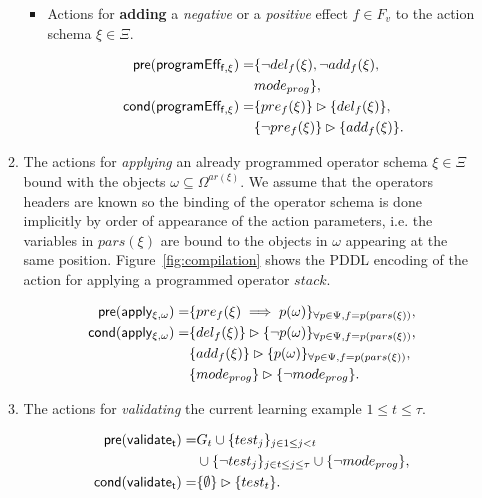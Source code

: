 \documentclass[letterpaper]{article} %
\newcommand{\pre}{\mathsf{pre}}     %
\newcommand{\cond}{\mathsf{cond}}   %
\begin{document}
\begin{itemize}
\begin{enumerate}
\begin{itemize}
\item Actions for {\bf adding} a {\em negative} or a {\em positive} effect $f\in F_v$ to the action schema $\xi\in\Xi$.

\begin{small}
\begin{align*}
\hspace*{7pt}\pre(\mathsf{programEff_{f,\xi}})=&\{\neg del_{f}(\xi),\neg add_{f}(\xi),\\
& mode_{prog}\},\\
\cond(\mathsf{programEff_{f,\xi}})=&\{pre_{f}(\xi)\}\rhd\{del_{f}(\xi)\},\\
&\{\neg pre_{f}(\xi)\}\rhd\{add_{f}(\xi)\}.
\end{align*}
\end{small}
\end{itemize}

\item The actions for {\em applying} an already programmed operator schema $\xi\in\Xi$ bound with the objects $\omega\subseteq\Omega^{ar(\xi)}$. We assume that the operators headers are known so the binding of the operator schema is done implicitly by order of appearance of the action parameters, i.e. the variables in $pars(\xi)$ are bound to the objects in $\omega$ appearing at the same position. Figure~\ref{fig:compilation} shows the PDDL encoding of the action for applying a programmed operator $stack$.
\begin{small}
\begin{align*}
\hspace*{7pt}\pre(\mathsf{apply_{\xi,\omega}})=&\{pre_{f}(\xi)\implies p(\omega)\}_{\forall p\in\Psi,f=p(pars(\xi))},\\
\cond(\mathsf{apply_{\xi,\omega}})=&\{del_{f}(\xi)\}\rhd\{\neg p(\omega)\}_{\forall p\in\Psi,f=p(pars(\xi))},\\
&\{add_{f}(\xi)\}\rhd\{p(\omega)\}_{\forall p\in\Psi,f=p(pars(\xi))},\\
&\{mode_{prog}\}\rhd\{\neg mode_{prog}\}.
\end{align*}
\end{small}

\item The actions for {\em validating} the current learning example {\tt\small $1\leq t\leq \tau$}.
\begin{small}
\begin{align*}
\hspace*{7pt}\pre(\mathsf{validate_{t}})=&G_t\cup\{test_j\}_{j\in 1\leq j<t}\\
&\cup\{\neg test_j\}_{j\in t\leq j\leq \tau}\cup \{\neg mode_{prog}\},\\
\cond(\mathsf{validate_{t}})=&\{\emptyset\}\rhd\{test_t\}.
\end{align*}
\end{small}
\end{enumerate}
\end{itemize}
\end{document}
